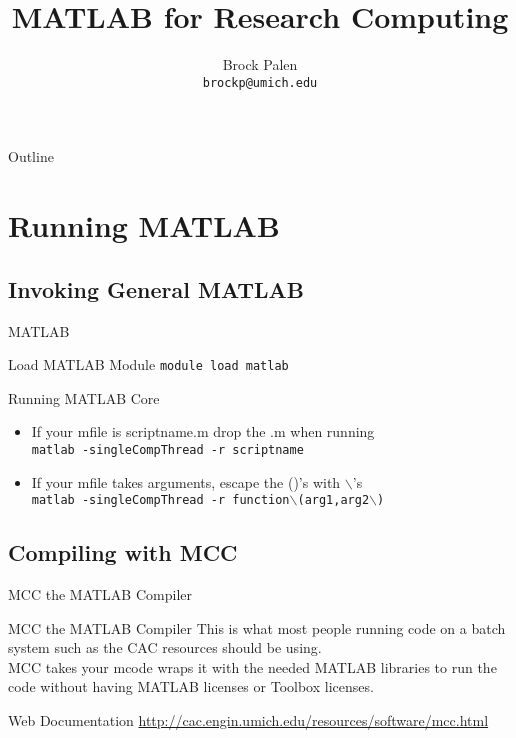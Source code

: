\documentclass[handout]{beamer}
\title[MATLAB for Research Computing] {MATLAB for Research Computing}
\author{Brock Palen\\ \texttt{brockp@umich.edu}}
\begin{document}
  \begin{frame}
    \titlepage
  \end{frame}

  \begin{frame}{Outline}
    \tableofcontents
  \end{frame}
  
  \section{Running MATLAB}
   \subsection{Invoking General MATLAB}
   \begin{frame}{MATLAB}
    \begin{block}{Load MATLAB Module}
         \texttt{module load matlab}
    \end{block}
    \begin{block}{Running MATLAB Core}
     \begin{itemize}
      \item If your mfile is scriptname.m drop the .m when running \\
        \texttt{matlab -singleCompThread -r scriptname} 
      \item If your mfile takes arguments, escape the ()'s with $\backslash$'s \\
        \texttt{matlab -singleCompThread -r function$\backslash$(arg1,arg2$\backslash$)}
     \end{itemize}
    \end{block}
    
   \end{frame}


   \subsection{Compiling with MCC}
   \begin{frame}{MCC the MATLAB Compiler}
    \begin{block}{MCC the MATLAB Compiler}
     This is what most people running code on a batch system such as the CAC resources should be using. \\
     MCC takes your mcode wraps it with the needed MATLAB libraries to run the code without having MATLAB licenses or Toolbox licenses.
    \end{block}
    \begin{block}{Web Documentation}
     \url{http://cac.engin.umich.edu/resources/software/mcc.html}
    \end{block}
   \end{frame}
 
\end{document}
